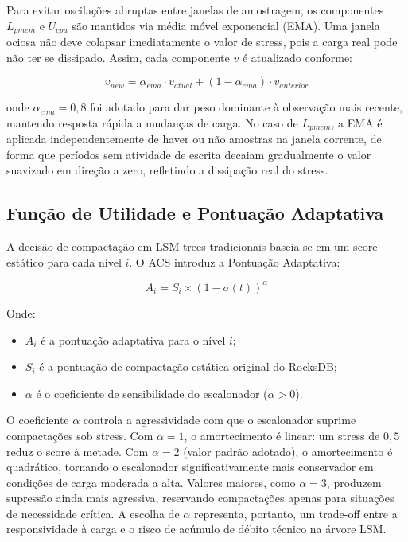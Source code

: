 Para evitar oscilações abruptas entre janelas de amostragem, os componentes
$L_{pmem}$ e $U_{cpu}$ são mantidos via média móvel exponencial (EMA). Uma janela
ociosa não deve colapsar imediatamente o valor de stress, pois a carga real pode
não ter se dissipado. Assim, cada componente $v$ é atualizado conforme:

\begin{equation}
    v_{new} = \alpha_{ema} \cdot v_{atual} + (1 - \alpha_{ema}) \cdot v_{anterior}
    \label{eq:ema}
\end{equation}

\noindent onde $\alpha_{ema} = 0{,}8$ foi adotado para dar peso dominante à
observação mais recente, mantendo resposta rápida a mudanças de carga. No caso de
$L_{pmem}$, a EMA é aplicada independentemente de haver ou não amostras na janela
corrente, de forma que períodos sem atividade de escrita decaiam gradualmente o
valor suavizado em direção a zero, refletindo a dissipação real do stress.

\subsection*{Função de Utilidade e Pontuação Adaptativa}

A decisão de compactação em LSM-trees tradicionais baseia-se em um score estático
para cada nível $i$. O ACS introduz a Pontuação Adaptativa:

\begin{equation}
    A_i = S_i \times (1 - \sigma(t))^{\alpha}
    \label{eq:adaptive_score}
\end{equation}

\noindent Onde:
\begin{itemize}
    \item $A_i$ é a pontuação adaptativa para o nível $i$;
    \item $S_i$ é a pontuação de compactação estática original do RocksDB;
    \item $\alpha$ é o coeficiente de sensibilidade do escalonador ($\alpha > 0$).
\end{itemize}

O coeficiente $\alpha$ controla a agressividade com que o escalonador suprime
compactações sob stress. Com $\alpha = 1$, o amortecimento é linear: um stress de
$0{,}5$ reduz o score à metade. Com $\alpha = 2$ (valor padrão adotado), o
amortecimento é quadrático, tornando o escalonador significativamente mais
conservador em condições de carga moderada a alta. Valores maiores, como
$\alpha = 3$, produzem supressão ainda mais agressiva, reservando compactações
apenas para situações de necessidade crítica. A escolha de $\alpha$ representa,
portanto, um trade-off entre a responsividade à carga e o risco de acúmulo de
débito técnico na árvore LSM.


